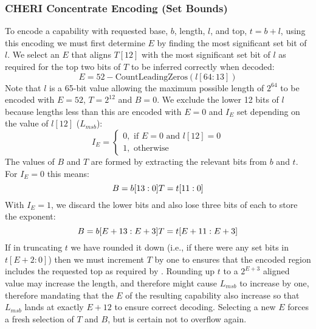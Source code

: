 \subsubsection{CHERI Concentrate Encoding (Set Bounds)}
\label{sec:cheri-concentrate-encoding-set-bounds}

To encode a capability with requested base, $b$, length, $l$, and top, $t = b + l$, using this encoding we must first determine $E$ by finding the most significant set bit of $l$. We select an $E$ that aligns $T[12]$ with the most significant set bit of $l$ as required for the top two bits of $T$ to be inferred correctly when decoded:
\[
E = 52 - \text{CountLeadingZeros}(l[64:13])
\]
Note that $l$ is a 65-bit value allowing the maximum possible length of $2^{64}$ to be encoded with $E=52$, $T=2^{12}$ and $B=0$. We exclude the lower 12 bits of $l$ because lengths less than this are encoded with $E = 0$ and $I_E$ set depending on the value of $l[12]$ ($L_{msb}$):
\[
I_E =
\begin{cases}
0,\text{ if }E=0\text{ and }l[12] = 0 \\
1,\text{ otherwise}
\end{cases}
\]
The values of $B$ and $T$ are formed by extracting the relevant bits from $b$ and $t$. For $I_E = 0$ this means:
\[
B = b[13:0] \\
T = t[11:0]
\]
With $I_E = 1$, we discard the lower bits and also lose three bits of each to store the exponent:
\[
B = b[E+13:E+3] \\
T = t[E+11:E+3]
\]
If in truncating $t$ we have rounded it down (i.e., if there were any set bits in $t[E+2:0]$) then we must increment $T$ by one to ensures that the encoded region includes the requested top as required by .
Rounding up $t$ to a $2^{E+3}$ aligned value may increase the length, and therefore might cause $L_{msb}$ to increase by one, therefore mandating that the $E$ of the resulting capability also increase so that $L_{msb}$ lands at exactly $E+12$ to ensure correct decoding.
Selecting a new $E$ forces a fresh selection of $T$ and $B$, but is certain not to overflow again.

